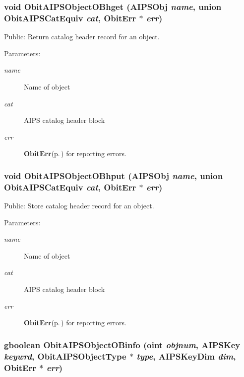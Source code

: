 \subsubsection{\setlength{\rightskip}{0pt plus 5cm}void Obit\-AIPSObject\-OBhget ({\bf AIPSObj} {\em name}, union {\bf Obit\-AIPSCat\-Equiv} {\em cat}, {\bf Obit\-Err} $\ast$ {\em err})}\label{ObitAIPSObject_8h_a22}


Public: Return catalog header record for an object. 

\begin{Desc}
\item[Parameters:]
\begin{description}
\item[{\em name}]Name of object \item[{\em cat}]AIPS catalog header block \item[{\em err}]{\bf Obit\-Err}{\rm (p.\,\pageref{structObitErr})} for reporting errors. \end{description}
\end{Desc}
\subsubsection{\setlength{\rightskip}{0pt plus 5cm}void Obit\-AIPSObject\-OBhput ({\bf AIPSObj} {\em name}, union {\bf Obit\-AIPSCat\-Equiv} {\em cat}, {\bf Obit\-Err} $\ast$ {\em err})}\label{ObitAIPSObject_8h_a23}


Public: Store catalog header record for an object. 

\begin{Desc}
\item[Parameters:]
\begin{description}
\item[{\em name}]Name of object \item[{\em cat}]AIPS catalog header block \item[{\em err}]{\bf Obit\-Err}{\rm (p.\,\pageref{structObitErr})} for reporting errors. \end{description}
\end{Desc}
\subsubsection{\setlength{\rightskip}{0pt plus 5cm}gboolean Obit\-AIPSObject\-OBinfo ({\bf oint} {\em objnum}, {\bf AIPSKey} {\em keywrd}, Obit\-AIPSObject\-Type $\ast$ {\em type}, {\bf AIPSKey\-Dim} {\em dim}, {\bf Obit\-Err} $\ast$ {\em err})}\label{ObitAIPSObject_8h_a20}


